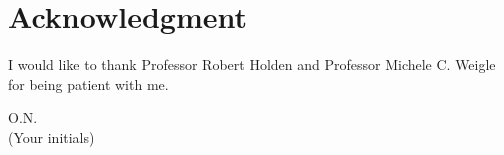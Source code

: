 \section*{Acknowledgment}
I would like to thank Professor Robert Holden and Professor Michele C. Weigle for being patient with me.

\begin{flushright}
O.N.\\[1pc]
(Your initials)
\end{flushright}